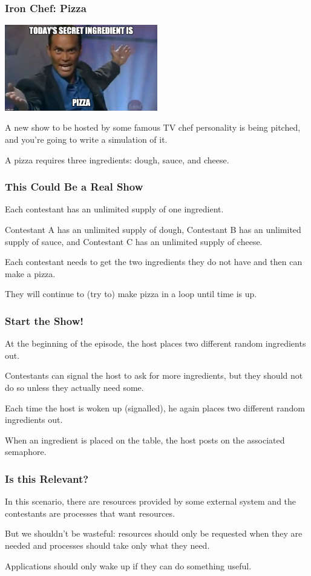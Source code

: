 \begin{frame}
\frametitle{Iron Chef: Pizza}
\begin{center}
	\includegraphics[width=0.5\textwidth]{images/ironchef.jpg}
\end{center}

A new show to be hosted by some famous TV chef personality is being pitched, and you're going to write a simulation of it. 

A pizza requires three ingredients: dough, sauce, and cheese.

\end{frame}

\begin{frame}
\frametitle{This Could Be a Real Show}

Each contestant has an unlimited supply of one ingredient. 

Contestant A has an unlimited supply of dough, Contestant B has an unlimited supply of sauce, and Contestant C has an unlimited supply of cheese.

 Each contestant needs to get the two ingredients they do not have and then can make a pizza.

They will continue to (try to) make pizza in a loop until time is up.

\end{frame}

\begin{frame}
\frametitle{Start the Show!}
At the beginning of the episode, the host places two different random ingredients out. 

Contestants can signal the host to ask for more ingredients, but they should not do so unless they actually need some. 

Each time the host is woken up (signalled), he again places two different random ingredients out.

When an ingredient is placed on the table, the host posts on the associated semaphore. 

\end{frame}

\begin{frame}
\frametitle{Is this Relevant?}

In this scenario, there are resources provided by some external system and the contestants are processes that want resources. 

But we shouldn't be wasteful: resources should only be requested when they are needed and processes should take only what they need. 

Applications should only wake up if they can do something useful.

\end{frame}

